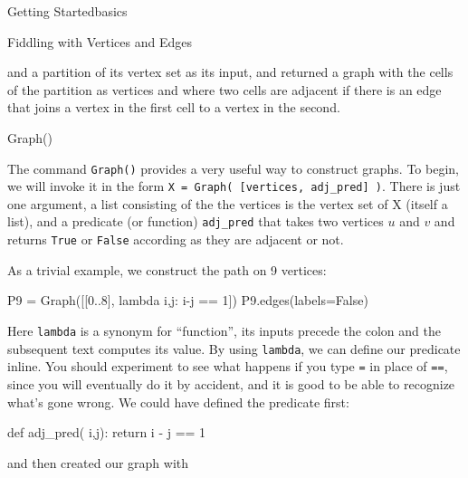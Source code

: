 \begin{chap}{Getting Started}{basics}
\begin{sect}{Fiddling with Vertices and Edges}
\begin{para}
and a partition of its vertex set as its input, and returned
a graph with the cells of the partition as vertices and where
two cells are adjacent if there is an edge that joins a vertex
in the first cell to a vertex in the second.
\end{para}
%
\end{sect}
%
\begin{sect}{Graph()}
%
\begin{para}
The command \verb|Graph()| provides a very useful way to construct graphs.
To begin, we will invoke it in the form \verb|X = Graph( [vertices, adj_pred] )|.
There is just one argument, a list consisting of the
the vertices is the vertex set of X (itself a list), and a predicate (or function)
\verb|adj_pred| that takes two vertices $u$ and $v$ and returns \verb|True| or
\verb|False| according as they are adjacent or not.
\end{para}
%
\begin{para}
As a trivial example, we construct the path on 9 vertices:
\end{para}
%
\begin{sagecode}
\begin{sageinput}
P9 = Graph([[0..8], lambda i,j: i-j == 1])
P9.edges(labels=False)
\end{sageinput}
\begin{sageoutput}
[(0, 1), (1, 2), (2, 3), (3, 4), (4, 5), (5, 6), (6, 7), (7, 8)]
\end{sageoutput}
\end{sagecode}
%
\begin{para}
Here \verb|lambda| is a synonym for ``function'', its inputs precede the colon
and the subsequent text computes its value. By using \verb|lambda|, we can define
our predicate inline. You should experiment to see what happens if you type 
\verb|=| in place of \verb|==|, since you will eventually do it by accident, 
and it is good to be able to recognize what's gone wrong.
We could have defined the predicate first:
\end{para}
%
\begin{sagecode}
\begin{sageinput}
def adj_pred( i,j):
    return i - j == 1
\end{sageinput}
\begin{sageoutput}
\end{sageoutput}
\end{sagecode}
%
\begin{para}
and then created our graph with
\end{para}

\end{sect}
\end{chap}
